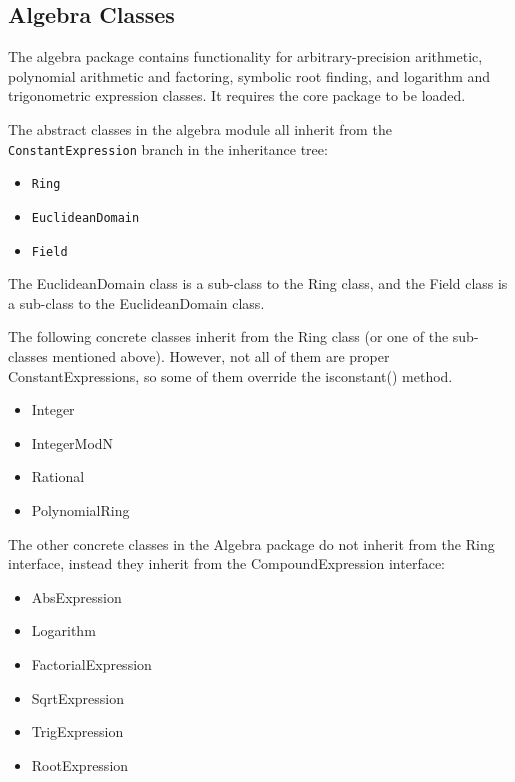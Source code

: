 \documentclass{article}
\begin{document}

\subsection{Algebra Classes}

The algebra package contains functionality for arbitrary-precision arithmetic, polynomial arithmetic and factoring, symbolic root finding, and logarithm and trigonometric expression classes. It requires the core package to be loaded.

The abstract classes in the algebra module all inherit from the \texttt{ConstantExpression} branch in the inheritance tree:

\begin{itemize}
    \item \texttt{Ring}
    \item \texttt{EuclideanDomain}
    \item \texttt{Field}
\end{itemize}    

The {\ttfamily EuclideanDomain} class is a sub-class to the {\ttfamily Ring} class, and the {\ttfamily Field} class is a sub-class to the {\ttfamily EuclideanDomain} class.

The following concrete classes inherit from the {\ttfamily Ring} class (or one of the sub-classes mentioned above). However, not all of them are proper {\ttfamily ConstantExpression}s, so some of them override the {\ttfamily isconstant()} method.

\begin{itemize}
    \item {\ttfamily Integer} 
    \item {\ttfamily IntegerModN}
    \item {\ttfamily Rational}
    \item {\ttfamily PolynomialRing}
\end{itemize}

The other concrete classes in the Algebra package do not inherit from the {\ttfamily Ring} interface, instead they inherit from the {\ttfamily CompoundExpression} interface:

\begin{itemize}
    \item {\ttfamily AbsExpression}
    \item {\ttfamily Logarithm}
    \item {\ttfamily FactorialExpression}
    \item {\ttfamily SqrtExpression}
    \item {\ttfamily TrigExpression}
    \item {\ttfamily RootExpression}
\end{itemize}
\end{document}

